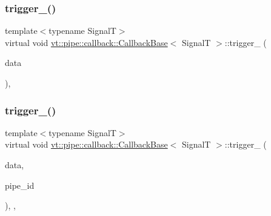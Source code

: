 \mbox{\label{structvt_1_1pipe_1_1callback_1_1_callback_base_a75a9b0103e0129f536385b10b86400c3}} 
\subsubsection{\texorpdfstring{trigger\+\_\+()}{trigger\_()}\hspace{0.1cm}{\footnotesize\ttfamily [1/2]}}
{\footnotesize\ttfamily template$<$typename SignalT$>$ \\
virtual void \hyperlink{structvt_1_1pipe_1_1callback_1_1_callback_base}{vt\+::pipe\+::callback\+::\+Callback\+Base}$<$ SignalT $>$\+::trigger\+\_\+ (\begin{DoxyParamCaption}\item[{\hyperlink{structvt_1_1pipe_1_1callback_1_1_callback_base_aa1c1fd83b75220a50f6dcd7c1617726e}{Signal\+Data\+Type} $\ast$}]{data }\end{DoxyParamCaption})\hspace{0.3cm}{\ttfamily [protected]}, {}}

\mbox{\label{structvt_1_1pipe_1_1callback_1_1_callback_base_ac14c6c68a45c6f7e18c73daa45b23b83}} 
\subsubsection{\texorpdfstring{trigger\+\_\+()}{trigger\_()}\hspace{0.1cm}{\footnotesize\ttfamily [2/2]}}
{\footnotesize\ttfamily template$<$typename SignalT$>$ \\
virtual void \hyperlink{structvt_1_1pipe_1_1callback_1_1_callback_base}{vt\+::pipe\+::callback\+::\+Callback\+Base}$<$ SignalT $>$\+::trigger\+\_\+ (\begin{DoxyParamCaption}\item[{\hyperlink{structvt_1_1pipe_1_1callback_1_1_callback_base_aa1c1fd83b75220a50f6dcd7c1617726e}{Signal\+Data\+Type} $\ast$}]{data,  }\item[{\hyperlink{namespacevt_ac9852acda74d1896f48f406cd72c7bd3}{Pipe\+Type} const \&}]{pipe\+\_\+id }\end{DoxyParamCaption})\hspace{0.3cm}{\ttfamily [inline]}, {\ttfamily [protected]}, {\ttfamily [virtual]}}



